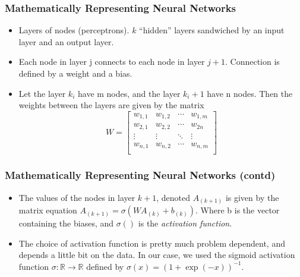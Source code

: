 \documentclass{beamer}
\begin{document}
\begin{frame}
    \frametitle{Mathematically Representing Neural Networks}
    \begin{itemize}
    \pause
    \item Layers of nodes (perceptrons). $k$ ``hidden'' layers sandwiched by an input layer and an output layer. \\
    \pause
    \item Each node in layer j connects to each node in layer $j+1$. Connection is defined by a weight and a bias.  \\
    \pause
    \item Let the layer $k_i$ have m nodes, and the layer $k_i+1$ have n nodes. Then the weights between the layers are given by the matrix
    \pause
    \begin{equation}
        W =
        \left[ {\begin{array}{cccc}
          w_{1,1} & w_{1,2} & \cdots & w_{1,m}\\
          w_{2,1} & w_{2,2} & \cdots & w_{2n}\\
          \vdots & \vdots & \ddots & \vdots\\
          w_{n,1} & w_{n,2} & \cdots & w_{n,m}\\
        \end{array} } \right]
        \label{weights1}
    \end{equation}
\end{itemize}
\end{frame}
    

\begin{frame}
    \frametitle{Mathematically Representing Neural Networks (contd)}
    \begin{itemize} 
    \item The values of the nodes in layer $k+1$, denoted $A_{(k+1)}$ is given by the matrix equation $A_{(k+1)} = \sigma(WA_{(k)}+b_{(k)})$. Where
        b is the vector containing the biases, and $\sigma()$ is the \textit{activation function}.
    \pause
\item The choice of activation function is pretty much problem dependent, and depends a little bit on the data. In our case, we used the sigmoid activation function $\sigma : \mathbb{R} \rightarrow \mathbb{R}$ defined by  $\sigma(x) = (1+\exp(-x))^{-1}$.
    \end{itemize}
\end{frame}
\end{document}
